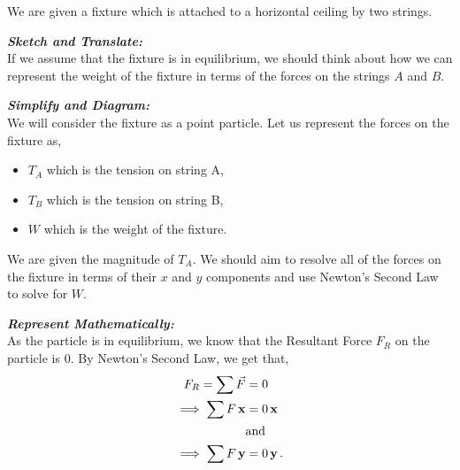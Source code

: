%
%
%


\begin{subquestions}

\subquestion
We are given a fixture which is attached to a horizontal ceiling by two strings.
\begin{subsubquestions}

\subsubquestion

\textbf{\textit{Sketch and Translate:}} \\
If we assume that the fixture is in equilibrium, we should think about how we can represent the weight of the fixture in terms of the forces on the strings $A$ and $B$.




\textbf{\textit{Simplify and Diagram:}} \\
We will consider the fixture as a point particle. Let us represent the forces on the fixture as,
\begin{itemize}
	\item $T_A$ which is the tension on string A,
	\item $T_B$ which is the tension on string B, 
	\item $W$ which is the weight of the fixture.
\end{itemize}
We are given the magnitude of $T_A$. We should aim to resolve all of the forces on the fixture in terms of their $x$ and $y$ components and use Newton's Second Law to solve for $W$.




\textbf{\textit{Represent Mathematically:}} \\
As the particle is in equilibrium, we know that the Resultant Force $F_R$ on the particle is 0. By Newton's Second Law, we get that,
\begin{align}
	F_R = \sum \vec{F} & = 0 \nonumber \\
	\implies \sum F \,\mathbf{x} & = 0 \,\mathbf{x} \label{2016:q5:XEqn1} \\
	& \text{and} \nonumber \\
	\implies \sum F \,\mathbf{y} & = 0 \,\mathbf{y} \label{2016:q5:YEqn1} \,.
\end{align}


\end{subsubquestions}
\end{subquestions}

